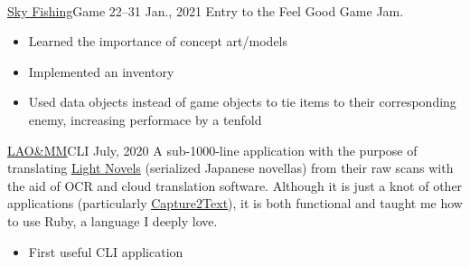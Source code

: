 \documentclass[10pt,a4paper,ragged2e,withhyper]{altacv}
\begin{document}
\begin{paracol}{2}
		
		
		\newpage
		
		\switchcolumn
		
		\cvtag{\LaTeX}
		
		 \\
		
		
		\cvevent
		{\href{https://jimmys-test-site.itch.io/skyfishing}{\uline{Sky Fishing}}{\hr}Game}
		{}
		{22--31 Jan., 2021}{}
		Entry to the Feel Good Game Jam.
		\smallskip
		\begin{itemize}
			\item Learned the importance of concept art/models
			\item Implemented an inventory
			\item Used data objects instead of game objects to tie items to their corresponding enemy, increasing performace by a tenfold
		\end{itemize}
		
		\divider
		
		\cvevent
		{\href{https://github.com/jaacko-torus/lao-mm/}{\uline{LAO\&MM}}{\hr}CLI}
		{}
		{July, 2020}{}
		A sub-1000-line application with the purpose of translating \href{https://en.wikipedia.org/wiki/Light_novel}{\uline{Light Novels}} (serialized Japanese novellas) from their raw scans with the aid of OCR and cloud translation software. Although it is just a knot of other applications (particularly \href{http://capture2text.sourceforge.net}{\uline{Capture2Text}}), it is both functional and taught me how to use Ruby, a language I deeply love.
		\smallskip
		\begin{itemize}
			\item First useful CLI application
		\end{itemize}
		

\end{paracol}
\end{document}

